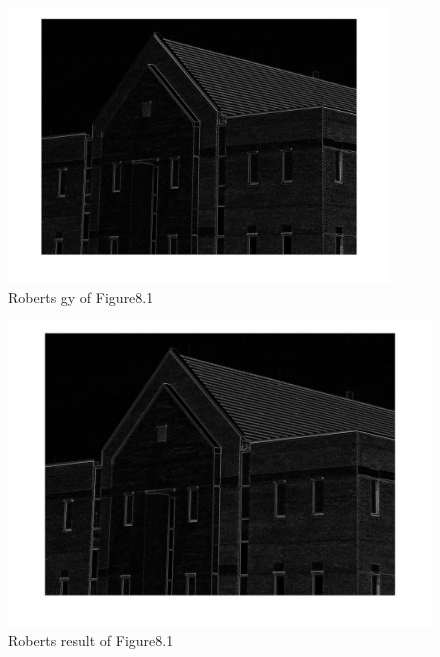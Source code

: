 \documentclass[11pt,oneside]{book}
\begin{document}
\begin{figure}[!htb]
   \centering  
   \includegraphics[width=0.9\textwidth]{images/9/roberts_y.jpg}
   \caption{Roberts gy of Figure8.1}
\end{figure}
\newpage
\begin{figure}[!htb]
   \centering  
   \includegraphics[width=1\textwidth]{images/9/roberts.jpg}
   \caption{Roberts result of Figure8.1}
\end{figure}
\end{document}
